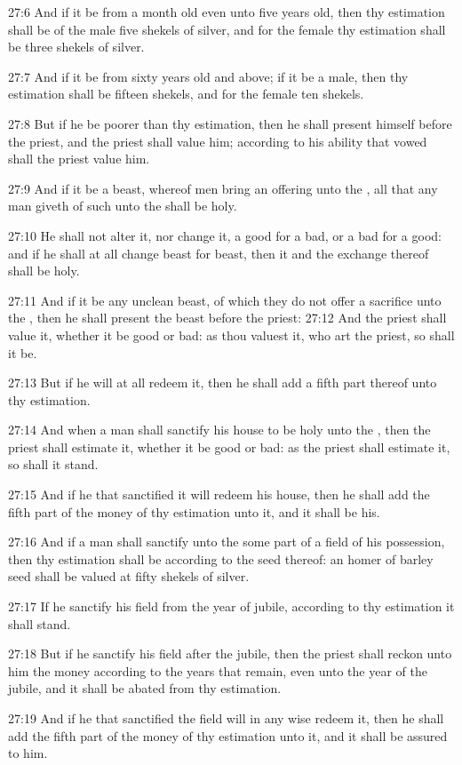 27:6 And if it be from a month old even unto five years old, then thy
estimation shall be of the male five shekels of silver, and for the
female thy estimation shall be three shekels of silver.

27:7 And if it be from sixty years old and above; if it be a male,
then thy estimation shall be fifteen shekels, and for the female ten
shekels.

27:8 But if he be poorer than thy estimation, then he shall present
himself before the priest, and the priest shall value him; according
to his ability that vowed shall the priest value him.

27:9 And if it be a beast, whereof men bring an offering unto the
\LORD, all that any man giveth of such unto the \LORD shall be holy.

27:10 He shall not alter it, nor change it, a good for a bad, or a bad
for a good: and if he shall at all change beast for beast, then it and
the exchange thereof shall be holy.

27:11 And if it be any unclean beast, of which they do not offer a
sacrifice unto the \LORD, then he shall present the beast before the
priest: 27:12 And the priest shall value it, whether it be good or
bad: as thou valuest it, who art the priest, so shall it be.

27:13 But if he will at all redeem it, then he shall add a fifth part
thereof unto thy estimation.

27:14 And when a man shall sanctify his house to be holy unto the
\LORD, then the priest shall estimate it, whether it be good or bad: as
the priest shall estimate it, so shall it stand.

27:15 And if he that sanctified it will redeem his house, then he
shall add the fifth part of the money of thy estimation unto it, and
it shall be his.

27:16 And if a man shall sanctify unto the \LORD some part of a field
of his possession, then thy estimation shall be according to the seed
thereof: an homer of barley seed shall be valued at fifty shekels of
silver.

27:17 If he sanctify his field from the year of jubile, according to
thy estimation it shall stand.

27:18 But if he sanctify his field after the jubile, then the priest
shall reckon unto him the money according to the years that remain,
even unto the year of the jubile, and it shall be abated from thy
estimation.

27:19 And if he that sanctified the field will in any wise redeem it,
then he shall add the fifth part of the money of thy estimation unto
it, and it shall be assured to him.

